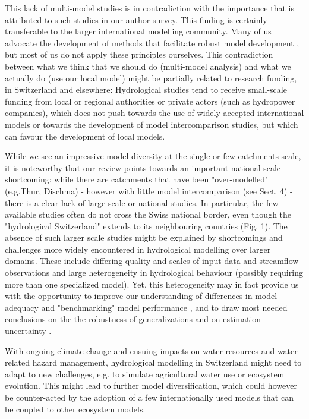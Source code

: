 \documentclass[10pt,a4paper]{article}
\begin{document}
This lack of multi-model studies is in contradiction with the importance that is attributed to such studies in our author survey. This finding is certainly transferable to the larger international modelling community. Many of us advocate the development of methods that facilitate robust model development \citep{Zheng2018}, but most of us do not apply these principles ourselves. This contradiction between what we think that we should do (multi-model analysis) and what we actually do (use our local model) might be partially related to research funding, in Switzerland and elsewhere: Hydrological studies tend to receive small-scale funding from local or regional authorities or private actors (such as hydropower companies), which does not push towards the use of widely accepted international models or towards the development of model intercomparison studies, but which can favour the development of local models.

While we see an impressive model diversity at the single or few catchments scale, it is noteworthy that our review points towards an important national-scale shortcoming: while there are catchments that have been "over-modelled" (e.g.Thur, Dischma) - however with little model intercomparison (see Sect. 4) - there is a clear lack of large scale or national studies. In particular, the few available studies often do not cross the  Swiss national border, even though the "hydrological Switzerland" extends to  its neighbouring countries (Fig. 1). The absence of such larger scale studies might be explained by shortcomings and challenges more widely encountered in hydrological modelling over larger domains. These include differing quality and scales of input data and streamflow observations and large heterogeneity in hydrological behaviour (possibly requiring more than one specialized model). Yet, this heterogeneity may in fact provide us with the opportunity to improve our understanding  of differences in model adequacy and "benchmarking" model performance \citep{Newman2017,Lane2019}, and to draw most needed conclusions on the the robustness of generalizations and on estimation uncertainty \citep{Gupta2014, McMillan2016}.

With ongoing climate change and ensuing impacts on water resources and water-related hazard management, hydrological modelling in Switzerland might need to adapt to new challenges, e.g. to simulate agricultural water use or ecosystem evolution. This might lead to further model diversification, which could however be counter-acted by the adoption of a few internationally used models that can be coupled to other ecosystem models. 
\end{document}
